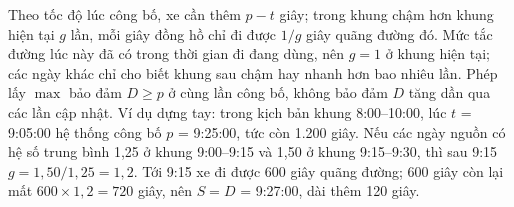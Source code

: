 Theo tốc độ lúc công bố, xe cần thêm $p - t$ giây; trong khung chậm hơn khung hiện tại $g$ lần, mỗi giây đồng hồ
chỉ đi được $1/g$ giây quãng đường đó. Mức tắc đường lúc này đã có trong thời gian đi đang dùng, nên $g = 1$ ở khung
hiện tại; các ngày khác chỉ cho biết khung sau chậm hay nhanh hơn bao nhiêu lần. Phép lấy $\max$ bảo đảm $D \ge p$ ở
cùng lần công bố, không bảo đảm $D$ tăng dần qua các lần cập nhật. Ví dụ dựng tay: trong kịch bản khung
8:00--10:00, lúc $t$ = 9:05:00 hệ thống công bố $p$ = 9:25:00, tức còn 1.200 giây. Nếu các ngày nguồn có hệ số trung
bình 1,25 ở khung 9:00--9:15 và 1,50 ở khung 9:15--9:30, thì sau 9:15 $g = 1{,}50/1{,}25 = 1{,}2$. Tới 9:15 xe đi
được 600 giây quãng đường; 600 giây còn lại mất $600 \times 1{,}2 = 720$ giây, nên $S = D$ = 9:27:00, dài thêm 120
giây.

